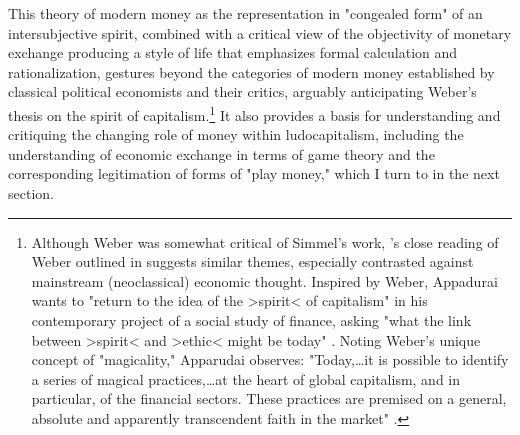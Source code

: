 This theory of modern money as the representation in "congealed form" \autocite[175]{Simmel04} of an intersubjective spirit, combined with a critical view of the objectivity of monetary exchange producing a style of life that emphasizes formal calculation and rationalization, gestures beyond the categories of modern money established by classical political economists and their critics, arguably anticipating Weber's thesis on the spirit of capitalism.\footnote{
  Although Weber was somewhat critical of Simmel's work, \autocite{Appadurai12}'s close reading of Weber outlined in  suggests similar themes, especially contrasted against mainstream (neoclassical) economic thought. Inspired by Weber, Appadurai wants to "return to the idea of the >spirit< of capitalism" \autocite[7]{Appadurai12} in his contemporary project of a social study of finance, asking "what the link between >spirit< and >ethic< might be today" \autocite[8]{Appadurai12}. Noting Weber's unique concept of "magicality," Apparudai observes: "Today,…it is possible to identify a series of magical practices,…at the heart of global capitalism, and in particular, of the financial sectors. These practices are premised on a general, absolute and apparently transcendent faith in the market" \autocite[8--9]{Appadurai12}.
}
It also provides a basis for understanding and critiquing the changing role of money within ludocapitalism, including the understanding of economic exchange in terms of game theory and the corresponding legitimation of forms of "play money," which I turn to in the next section.

